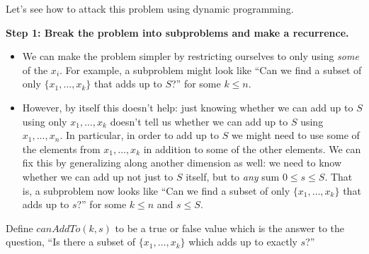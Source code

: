 \documentclass{tufte-handout}
\begin{document}
Let's see how to attack this problem using dynamic programming.

\noindent
\textbf{Step 1: Break the problem into subproblems and make a
  recurrence.}

\begin{itemize}
\item We can make the problem simpler by restricting ourselves to only
  using \emph{some} of the $x_i$.  For example, a subproblem might
  look like ``Can we find a subset of only $\{x_1, \dots, x_k\}$ that
  adds up to $S$?'' for some $k \leq n$.
\item However, by itself this doesn't help: just knowing whether we
  can add up to $S$ using only $x_1, \dots, x_k$ doesn't tell us
  whether we can add up to $S$ using $x_1, \dots, x_n$.  In
  particular, in order to add up to $S$ we might need to use some of
  the elements from $x_1, \dots, x_k$ in addition to some of the other
  elements.  We can fix this by generalizing along another dimension
  as well: we need to know whether we can add up not just to $S$
  itself, but to \emph{any} sum $0 \leq s \leq S$.  That is, a
  subproblem now looks like ``Can we find a subset of only $\{x_1,
  \dots, x_k\}$ that adds up to $s$?'' for some $k \leq n$ and $s \leq S$.
\end{itemize}

\newcommand{\canAddTo}{\mathit{canAddTo}}

Define $\canAddTo(k,s)$ to be a true or false value which is
the answer to the question, ``Is there a subset of $\{x_1, \dots,
x_k\}$ which adds up to exactly $s$?''
\end{document}
